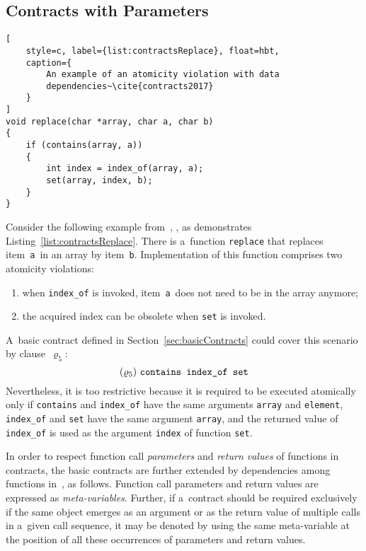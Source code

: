 \subsection{Contracts with Parameters}
\label{sec:parameterContracts}

\begin{lstlisting}[
    style=c, label={list:contractsReplace}, float=hbt,
    caption={
        An example of an atomicity violation with data
        dependencies~\cite{contracts2017}
    }
]
void replace(char *array, char a, char b)
{
    if (contains(array, a))
    {
        int index = index_of(array, a);
        set(array, index, b);
    }
}
\end{lstlisting}

\begin{example}
    Consider the following example from~\cite{contracts2017},
    \cite{contracts2015}, as demonstrates Listing~\ref{list:contractsReplace}.
    There is a~function \texttt{replace} that replaces item~\texttt{a}~in an
    array by item~\texttt{b}. Implementation of this function comprises two
    atomicity violations:
    \begin{enumerate}[label={(\roman*)}]
        \item
            when \texttt{index\_of} is invoked, item~\texttt{a}~does not need to
            be in the array anymore;

        \item
            the acquired index can be obsolete when \texttt{set} is invoked.
    \end{enumerate}
    A~basic contract defined in Section~\ref{sec:basicContracts} could cover
    this scenario by clause~$ \varrho_5 $:
    $$ (\varrho_5)\ \text{\texttt{contains index\_of set}} $$
    Nevertheless, it is too restrictive because it is required to be executed
    atomically only if \texttt{contains} and \texttt{index\_of} have the same
    arguments \texttt{array} and \texttt{element}, \texttt{index\_of} and
    \texttt{set} have the same argument \texttt{array}, and the returned value of
    \texttt{index\_of} is used as the argument \texttt{index} of function
    \texttt{set}.
\end{example}

In order to respect function call \emph{parameters} and \emph{return values}
of functions in contracts, the basic contracts are further extended by
dependencies among functions in~\cite{contracts2017}, \cite{contracts2015}
as follows. Function call parameters and return values are expressed as
\emph{meta-variables}. Further, if a~contract should be required exclusively
if the same object emerges as an argument or as the return value of multiple
calls in a~given call sequence, it may be denoted by using the same
meta-variable at the position of all these occurrences of parameters and
return values.

